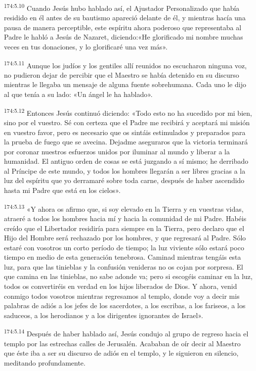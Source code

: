 \par 
\textsuperscript{174:5.10} Cuando Jesús hubo hablado así, el Ajustador Personalizado que había residido en él antes de su bautismo apareció delante de él, y mientras hacía una pausa de manera perceptible, este espíritu ahora poderoso que representaba al Padre le habló a Jesús de Nazaret, diciendo:«He glorificado mi nombre muchas veces en tus donaciones, y lo glorificaré una vez más».

\par 
\textsuperscript{174:5.11} Aunque los judíos y los gentiles allí reunidos no escucharon ninguna voz, no pudieron dejar de percibir que el Maestro se había detenido en su discurso mientras le llegaba un mensaje de alguna fuente sobrehumana. Cada uno le dijo al que tenía a su lado: «Un ángel le ha hablado».

\par 
\textsuperscript{174:5.12} Entonces Jesús continuó diciendo: «Todo esto no ha sucedido por mi bien, sino por el vuestro. Sé con certeza que el Padre me recibirá y aceptará mi misión en vuestro favor, pero es necesario que os sintáis estimulados y preparados para la prueba de fuego que se avecina. Dejadme aseguraros que la victoria terminará por coronar nuestros esfuerzos unidos por iluminar al mundo y liberar a la humanidad. El antiguo orden de cosas se está juzgando a sí mismo; he derribado al Príncipe de este mundo, y todos los hombres llegarán a ser libres gracias a la luz del espíritu que yo derramaré sobre toda carne, después de haber ascendido hasta mi Padre que está en los cielos».

\par 
\textsuperscript{174:5.13} «Y ahora os afirmo que, si soy elevado en la Tierra y en vuestras vidas, atraeré a todos los hombres hacia mí y hacia la comunidad de mi Padre. Habéis creído que el Libertador residiría para siempre en la Tierra, pero declaro que el Hijo del Hombre será rechazado por los hombres, y que regresará al Padre. Sólo estaré con vosotros un corto período de tiempo; la luz viviente sólo estará poco tiempo en medio de esta generación tenebrosa. Caminad mientras tengáis esta luz, para que las tinieblas y la confusión venideras no os cojan por sorpresa. El que camina en las tinieblas, no sabe adonde va; pero si escogéis caminar en la luz, todos os convertiréis en verdad en los hijos liberados de Dios. Y ahora, venid conmigo todos vosotros mientras regresamos al templo, donde voy a decir mis palabras de adiós a los jefes de los sacerdotes, a los escribas, a los fariseos, a los saduceos, a los herodianos y a los dirigentes ignorantes de Israel».

\par 
\textsuperscript{174:5.14} Después de haber hablado así, Jesús condujo al grupo de regreso hacia el templo por las estrechas calles de Jerusalén. Acababan de oír decir al Maestro que éste iba a ser su discurso de adiós en el templo, y le siguieron en silencio, meditando profundamente.